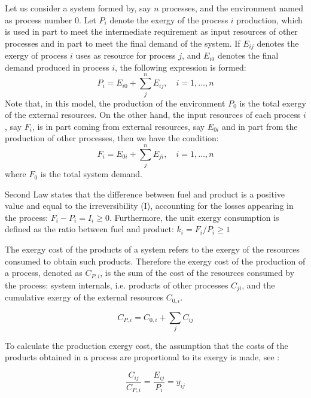 \documentclass[sustainability,article,submit,moreauthors,pdftex,12pt,a4paper]{mdpi}
\begin{document}
Let us consider a system formed by, say $n$ processes, and the environment named as process number 0. Let $P_i$ denote the  exergy of the process $i$ production, which is used in part to meet the intermediate requirement as input resources of other processes and in part to meet the final demand of the system. If $E_{ij}$ denotes the exergy of process $i$ uses as resource for process $j$, and $E_{i0}$ denotes the final demand produced in process $i$, the following expression is formed:
\begin{equation}
\label{eq:F}
P_i=E_{i0}+\sum_{j}^{n}E_{ij}, \quad i=1,\ldots,n
\end{equation}
Note that, in this model, the production of the environment $P_0$ is the total exergy of the external resources. On the other hand, the input resources of each process $i$, say $F_i$, is in
part coming from external resources, say $E_{0i}$ and in part from the
production of other processes, then we have the condition:
\begin{equation}
\label{eq:P}
F_i=E_{0i}+\sum_{j}^{n}E_{ji}, \quad i=1,\ldots,n
\end{equation}
\noindent where $F_0$ is the total system demand.

Second Law states that the difference between fuel and product is a positive 
value and equal to the irreversibility (I), accounting for the losses 
appearing in the process: $F_i - P_i = I_i \geq 0$. Furthermore, the unit 
exergy consumption is defined as the ratio between fuel and product: 
$k_i={F_i}/{P_i} \geq 1$

The exergy cost of the products of a system refers to the exergy of the resources consumed to obtain such products. Therefore the exergy cost of the production of a process, denoted as $C_{P,i}$,  is the sum of the cost of the resources consumed by the process: system internals, i.e. products of other processes $C_{ji}$, and the cumulative exergy of the external resources $C_{0,i}$.

\begin{equation}
 C_{P,i}=C_{0,i}+\sum_{j}C_{ij}
 \label{eq1}
\end{equation}

To calculate the production exergy cost, the assumption that the costs of the products obtained in a process are proportional to its exergy is made, see \cite{Lozano1993}:

\begin{equation}
\frac{C_{ij}}{C_{P,i}}=\frac{E_{ij}}{P_i}=y_{ij}
\label{eq2}
\end{equation}
\end{document}
